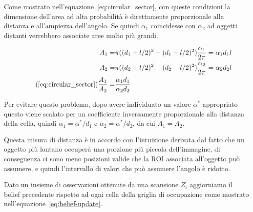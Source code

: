 \documentclass[a4paper]{article}
\begin{document}
	Come mostrato nell'equazione~\ref{eq:circular_sector}, con queste
	condizioni la dimensione dell'area ad alta probabilità è direttamente
	proporzionale alla distanza e all'ampiezza dell'angolo. Se quindi $
	\alpha_1 $ coincidesse con $ \alpha _2 $ ad oggetti distanti verrebbero
	associate aree molto più grandi. 

	\begin{subequations}\label{eq:circular_sector}
	\begin{align*} 
		A_1  = & \pi((d_1+l/2)^2-(d_1-l/2)^2)\frac{\alpha_1}{2\pi}  =  \alpha_1 d_1l \\
		A_2  = & \pi((d_2+l/2)^2-(d_2-l/2)^2)\frac{\alpha_2}{2\pi}  =  \alpha_2 d_2l \\
\tag{\ref{eq:circular_sector}}
		\frac{A_1}{A_2} = & \frac	{\alpha_1 d_1} {\alpha_2 d_2}
	\end{align*}
	\end{subequations}
	
		
	Per evitare questo problema, dopo avere
	individuato un valore $ \alpha ^* $ appropriato questo viene scalato per un
	coefficiente inversamente proporzionale alla distanza della cella, quindi $
	\alpha _1 = \alpha ^*/d_1 $ e $ \alpha _2=\alpha ^*/d_2 $, da cui $A_1=A_2$. 
	
	Questa misura di distanza è in accordo con l'intuizione derivata dal fatto
	che un oggetto più lontano occuperà una porzione più piccola dell'immagine,
	di conseguenza ci sono meno posizioni valide che la ROI associata
	all'oggetto può assumere, e quindi l'intervallo di valori che può assumere
	l'angolo è ridotto.

	
	Dato un insieme di osservazioni ottenute da una scansione $ Z_i $ aggiorniamo il belief precedente rispetto ad ogni cella della griglia di occupazione come mostrato nell'equazione~\ref{eq:belief-update}.
\end{document}
